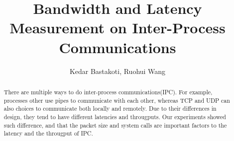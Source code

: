 \documentclass[10pt]{article}
\begin{document}
\title{Bandwidth and Latency Measurement on Inter-Process Communications}
\author{Kedar Bastakoti, Ruohui Wang}
\date{}

\maketitle

\begin{abstract}
    There are multiple ways to do inter-process communications(IPC). For example, processes other use pipes to communicate with each other, whereas TCP and UDP can also choices to communicate both locally and remotely. Due to their differences in design, they tend to have different latencies and througputs. Our experiments showed such difference, and that the packet size and system calls are important factors to the latency and the througput of IPC.
\end{abstract}










    
\end{document}
